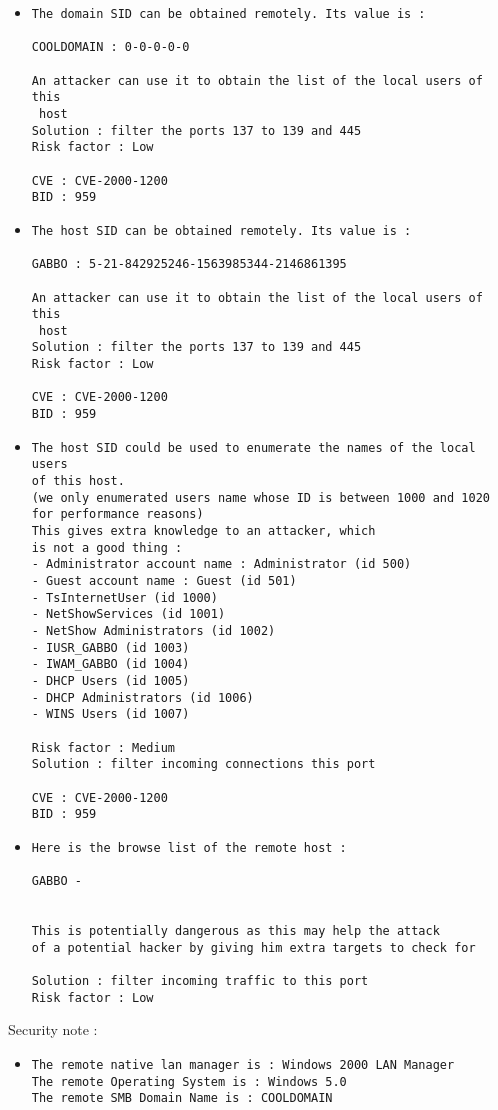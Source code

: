 \documentclass{article}
\begin{document}
\begin{itemize}
\item \begin{verbatim}
The domain SID can be obtained remotely. Its value is :

COOLDOMAIN : 0-0-0-0-0

An attacker can use it to obtain the list of the local users of this
 host
Solution : filter the ports 137 to 139 and 445
Risk factor : Low

CVE : CVE-2000-1200
BID : 959
\end{verbatim}\item \begin{verbatim}
The host SID can be obtained remotely. Its value is :

GABBO : 5-21-842925246-1563985344-2146861395

An attacker can use it to obtain the list of the local users of this
 host
Solution : filter the ports 137 to 139 and 445
Risk factor : Low

CVE : CVE-2000-1200
BID : 959
\end{verbatim}\item \begin{verbatim}
The host SID could be used to enumerate the names of the local users
of this host. 
(we only enumerated users name whose ID is between 1000 and 1020
for performance reasons)
This gives extra knowledge to an attacker, which
is not a good thing : 
- Administrator account name : Administrator (id 500)
- Guest account name : Guest (id 501)
- TsInternetUser (id 1000)
- NetShowServices (id 1001)
- NetShow Administrators (id 1002)
- IUSR_GABBO (id 1003)
- IWAM_GABBO (id 1004)
- DHCP Users (id 1005)
- DHCP Administrators (id 1006)
- WINS Users (id 1007)

Risk factor : Medium
Solution : filter incoming connections this port

CVE : CVE-2000-1200
BID : 959
\end{verbatim}\item \begin{verbatim}
Here is the browse list of the remote host : 

GABBO - 


This is potentially dangerous as this may help the attack
of a potential hacker by giving him extra targets to check for

Solution : filter incoming traffic to this port
Risk factor : Low

\end{verbatim}\end{itemize}
Security note :\\
\begin{itemize}
\item \begin{verbatim}
The remote native lan manager is : Windows 2000 LAN Manager
The remote Operating System is : Windows 5.0
The remote SMB Domain Name is : COOLDOMAIN


\end{verbatim}\end{itemize}
\end{document}
